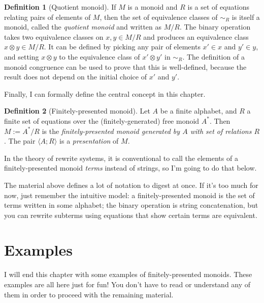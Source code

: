 \documentclass[a4paper,headsepline,bibliography=totoc,toc=flat,fleqn,twoside=semi]{scrbook}
\theoremstyle{definition}
\newtheorem{definition}{Definition}[chapter]
\theoremstyle{definition}
\theoremstyle{definition}
\begin{document}

\begin{definition}[Quotient monoid] If $M$ is a monoid and $R$ is a set of equations relating pairs of elements of $M$, then the set of equivalence classes of $\sim_R$ is itself a monoid, called the \emph{quotient monoid} and written as $M/R$. The binary operation takes two equivalence classes on $x, y\in M/R$ and produces an equivalence class $x\otimes y\in M/R$. It can be defined by picking any pair of elements $x'\in x$ and $y'\in y$, and setting $x\otimes y$ to the equivalence class of $x'\otimes y'$ in $\sim_R$. The definition of a monoid congruence can be used to prove that this is well-defined, because the result does not depend on the initial choice of $x'$ and $y'$.
\end{definition}

Finally, I can formally define the central concept in this chapter.

\begin{definition}[Finitely-presented monoid] Let $A$ be a finite alphabet, and $R$ a finite set of equations over the (finitely-generated) free monoid $A^*$. Then $M:=A^*/R$ is the \emph{finitely-presented monoid generated by $A$ with set of relations $R$}. The pair $\langle A;R\rangle$ is a \emph{presentation} of $M$.
\end{definition}

In the theory of rewrite systems, it is conventional to call the elements of a finitely-presented monoid \emph{terms} instead of strings, so I'm going to do that below.

The material above defines a lot of notation to digest at once. If it's too much for now, just remember the intuitive model: a finitely-presented monoid is the set of terms written in some alphabet; the binary operation is string concatenation, but you can rewrite subterms using equations that show certain terms are equivalent.

\section{Examples}
I will end this chapter with some examples of finitely-presented monoids. These examples are all here just for fun! You don't have to read or understand any of them in order to proceed with the remaining material.
\end{document}
